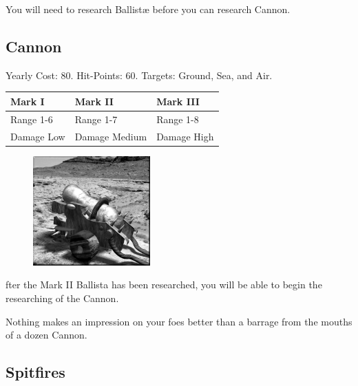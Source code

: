 You will need to research Ballistæ before you can research Cannon.

\clearpage

\subsection{Cannon}


\begin{center}
	Yearly Cost: 80. Hit-Points: 60. Targets: Ground, Sea, and Air.
\end{center}

\begin{tabular}{ | p{1.3in} | p{1.3in} | p{1.3in} |}
	\hline
	\textbf{Mark I}	& \textbf{Mark II} & \textbf{Mark III} \\ \hline
	Range 1-6	& Range 1-7 & Range 1-8 \\ \hline
	Damage Low	& Damage Medium & Damage High \\ \hline
\end{tabular}
   
\begin{figure}
	\vspace{-20pt}
	\begin{center}
		\includegraphics[width=0.4\textwidth]{Acannon}
	\end{center}
	\vspace{-50pt}
\end{figure}

fter the Mark II Ballista has been researched, you will be able to begin the researching of the Cannon.

Nothing makes an impression on your foes better than a barrage from the mouths of a dozen Cannon.

\subsection{Spitfires}

